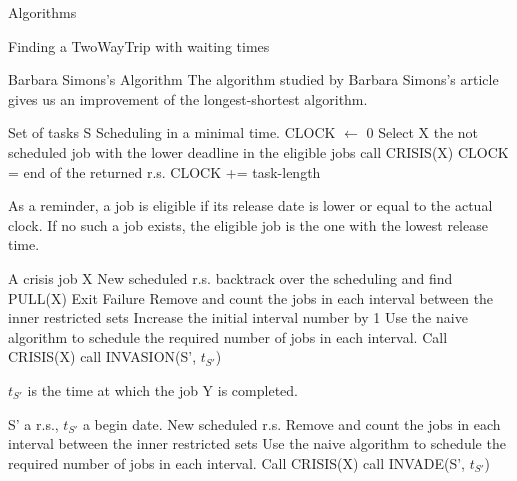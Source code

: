 \documentclass[a4paper,10pt]{report}
\begin{document}
\begin{chapter}{Algorithms}
\begin{section}{Finding a TwoWayTrip with waiting times}
\begin{subsection}{Barbara Simons's Algorithm}
 The algorithm studied by Barbara Simons's article \cite{simons1978fast} gives us an improvement of the longest-shortest algorithm.
 \begin{algorithm}[H]
\caption{Simons Main Algorithm}
\begin{algorithmic}
\REQUIRE Set of tasks S
\ENSURE Scheduling in a minimal time.
\STATE CLOCK $\leftarrow$ 0
\STATE Select X the not scheduled job with the lower deadline in the eligible jobs
\STATE call CRISIS(X)
\STATE CLOCK = end of the returned r.s.
\ELSE
\STATE CLOCK += task-length
\ENDIF

\ENDWHILE

\end{algorithmic}
\end{algorithm}
As a reminder, a job is eligible if its release date is lower or equal to the actual clock. If no such a job exists, the eligible job is the one
with the lowest release time.

 \begin{algorithm}[H]
\caption{Crisis Subroutine}
\begin{algorithmic}
\REQUIRE A crisis job X
\ENSURE New scheduled r.s.
\STATE backtrack over the scheduling and find PULL(X)
\STATE Exit Failure
\ENDIF 
\STATE Remove and count the jobs in each interval between the inner restricted sets
\STATE Increase the initial interval number by 1
\STATE Use the naive algorithm to schedule the required number of jobs in each interval.
\STATE Call CRISIS(X)
\ELSE
{}
\STATE call INVASION(S', $t_{S'}$)
\ENDIF
\ENDIF
\ENDWHILE

\end{algorithmic}
\end{algorithm}
$t_{S'}$ is the time at which the job Y is completed.


 \begin{algorithm}[H]
\caption{INVASION Subroutine}
\begin{algorithmic}
\REQUIRE S' a r.s., $t_{S'}$ a begin date.
\ENSURE New scheduled r.s.
\STATE Remove and count the jobs in each interval between the inner restricted sets
\STATE Use the naive algorithm to schedule the required number of jobs in each interval.
\STATE Call CRISIS(X)
\ELSE
{}
\STATE call INVADE(S', $t_{S'}$)
\ENDIF
\ENDIF
\ENDWHILE


\end{algorithmic}
\end{algorithm}
\end{subsection}
\end{section}
\end{chapter}
\end{document}
